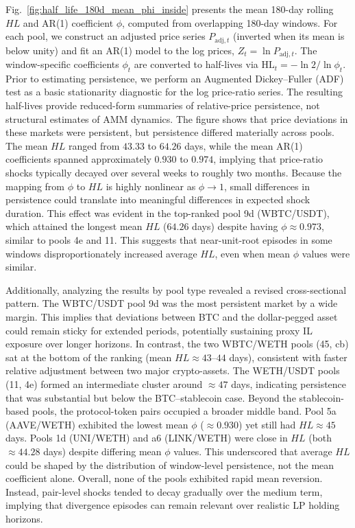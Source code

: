 \documentclass[10pt,conference,compsocconf]{IEEEtran}
\begin{document}
Fig.~\ref{fig:half_life_180d_mean_phi_inside} presents the mean 180-day rolling $HL$ and AR(1) coefficient $\phi$, computed from overlapping 180-day windows. 
For each pool, we construct an adjusted price series $P_{\text{adj},t}$ (inverted when its mean is below unity) and fit an AR(1) model to the log prices, $Z_t=\ln P_{\text{adj},t}$. 
The window-specific coefficients $\phi_t$ are converted to half-lives via $\mathrm{HL}_t=-\ln 2 / \ln \phi_t$.
Prior to estimating persistence, we perform an Augmented Dickey--Fuller (ADF) test as a basic stationarity diagnostic for the log price-ratio series. 
The resulting half-lives provide reduced-form summaries of relative-price persistence, not structural estimates of AMM dynamics.
The figure shows that price deviations in these markets were persistent, but persistence differed materially across pools. 
The mean $HL$ ranged from $43.33$ to $64.26$ days, while the mean AR(1) coefficients spanned approximately $0.930$ to $0.974$, implying that price-ratio shocks typically decayed over several weeks to roughly two months. 
Because the mapping from $\phi$ to $HL$ is highly nonlinear as $\phi\to 1$, small differences in persistence could translate into meaningful differences in expected shock duration.
This effect was evident in the top-ranked pool 9d (WBTC/USDT), which attained the longest mean $HL$ ($64.26$ days) despite having $\phi\approx0.973$, similar to pools 4e and 11. 
This suggests that near-unit-root episodes in some windows disproportionately increased average $HL$, even when mean $\phi$ values were similar.

Additionally, analyzing the results by pool type revealed a revised cross-sectional pattern.
The WBTC/USDT pool 9d was the most persistent market by a wide margin. 
This implies that deviations between BTC and the dollar-pegged asset could remain sticky for extended periods, potentially sustaining proxy IL exposure over longer horizons.
In contrast, the two WBTC/WETH pools (45, cb) sat at the bottom of the ranking (mean $HL\approx 43$--$44$ days), consistent with faster relative adjustment between two major crypto-assets. 
The WETH/USDT pools (11, 4e) formed an intermediate cluster around $\approx 47$ days, indicating persistence that was substantial but below the BTC--stablecoin case. 
Beyond the stablecoin-based pools, the protocol-token pairs occupied a broader middle band.
Pool 5a (AAVE/WETH) exhibited the lowest mean $\phi$ ($\approx0.930$) yet still had $HL\approx45$ days. 
Pools 1d (UNI/WETH) and a6 (LINK/WETH) were close in $HL$ (both $\approx44.28$ days) despite differing mean $\phi$ values. 
This underscored that average $HL$ could be shaped by the distribution of window-level persistence, not the mean coefficient alone.
Overall, none of the pools exhibited rapid mean reversion. Instead, pair-level shocks tended to decay gradually over the medium term, implying that divergence episodes can remain relevant over realistic LP holding horizons.
\end{document}
